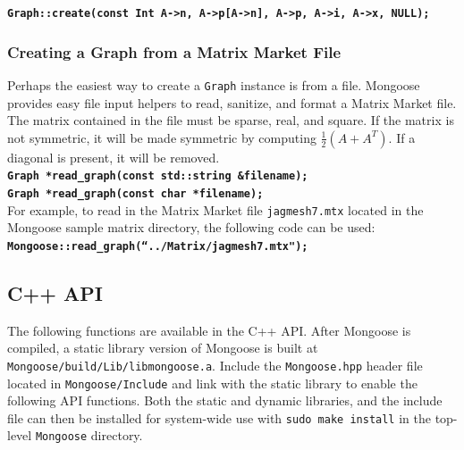 \documentclass[letter]{article}
\begin{document}
\textbf{\texttt{Graph::create(const Int A->n, A->p[A->n], A->p, A->i, A->x, NULL);}}

\subsubsection{Creating a Graph from a Matrix Market File}

Perhaps the easiest way to create a \texttt{Graph} instance is from a file. Mongoose provides easy file input helpers to read, sanitize, and format a Matrix Market file. The matrix contained in the file must be sparse, real, and square. If the matrix is not symmetric, it will be made symmetric by computing $\frac{1}{2}(A+A^T)$. If a diagonal is present, it will be removed.\\

\textbf{\texttt{Graph *read\_graph(const std::string \&filename);}}\\
\textbf{\texttt{Graph *read\_graph(const char *filename);}}\\

For example, to read in the Matrix Market file \texttt{jagmesh7.mtx} located in the Mongoose sample matrix directory, the following code can be used:\\

\textbf{\texttt{Mongoose::read\_graph(``../Matrix/jagmesh7.mtx");}}

\subsection{C++ API}

The following functions are available in the C++ API. After Mongoose is compiled, a static library version of Mongoose is built at \texttt{Mongoose/build/Lib/libmongoose.a}. Include the \texttt{Mongoose.hpp} header file located in \texttt{Mongoose/Include} and link with the static library to enable the following API functions.
Both the static and dynamic libraries, and the include file can then be
installed for system-wide use with \texttt{sudo make install} in the top-level
\texttt{Mongoose} directory.
\end{document}
